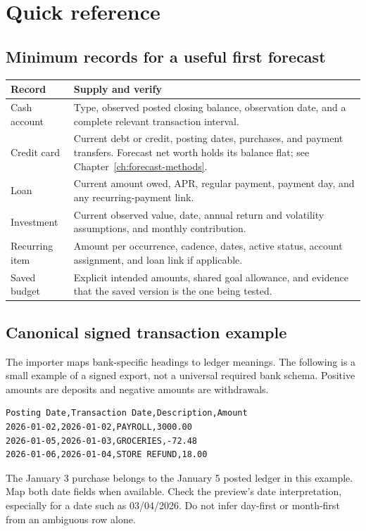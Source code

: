 \chapter{Quick reference}\label{app:reference}
\section{Minimum records for a useful first forecast}
\begin{tabularx}{\textwidth}{@{}p{}Y@{}}
\toprule Record & Supply and verify\\\midrule
Cash account & Type, observed posted closing balance, observation date, and a complete relevant transaction interval.\\
Credit card & Current debt or credit, posting dates, purchases, and payment transfers. Forecast net worth holds its balance flat; see Chapter~\ref{ch:forecast-methods}.\\
Loan & Current amount owed, APR, regular payment, payment day, and any recurring-payment link.\\
Investment & Current observed value, date, annual return and volatility assumptions, and monthly contribution.\\
Recurring item & Amount per occurrence, cadence, dates, active status, account assignment, and loan link if applicable.\\
Saved budget & Explicit intended amounts, shared goal allowance, and evidence that the saved version is the one being tested.\\
\bottomrule
\end{tabularx}

\section{Canonical signed transaction example}
The importer maps bank-specific headings to ledger meanings. The following is a small example of a signed export, not a universal required bank schema. Positive amounts are deposits and negative amounts are withdrawals.

\begin{lstlisting}
Posting Date,Transaction Date,Description,Amount
2026-01-02,2026-01-02,PAYROLL,3000.00
2026-01-05,2026-01-03,GROCERIES,-72.48
2026-01-06,2026-01-04,STORE REFUND,18.00
\end{lstlisting}

The January 3 purchase belongs to the January 5 posted ledger in this example. Map both date fields when available. Check the preview's date interpretation, especially for a date such as 03/04/2026. Do not infer day-first or month-first from an ambiguous row alone.

